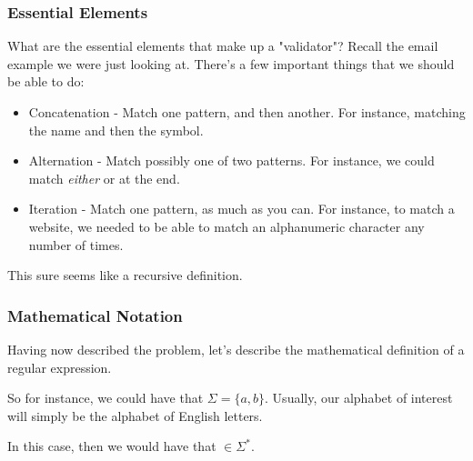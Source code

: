 \documentclass[aspectratio=169]{beamer}
\begin{document}
\begin{frame}[fragile]
  \frametitle{Essential Elements}

  \rprs

  What are the essential elements that make up a "validator"? Recall the email
  example we were just looking at. There's a few important things that we should
  be able to do:

  \pause
  \begin{itemize}
    \item Concatenation - Match one pattern, and then another. For instance,
    matching the name and then the  symbol. \pause
    \item Alternation - Match possibly one of two patterns. For instance, we
    could match \textit{either}  or  at the end. \pause
    \item Iteration - Match one pattern, as much as you can. For instance,
    to match a website, we needed to be able to match an alphanumeric character any
    number of times.
  \end{itemize}

  \pause
  \vspace{\fill}

  This sure seems like a recursive definition.
\end{frame}

\begin{frame}[fragile]
  \frametitle{Mathematical Notation}

  \ptmt

  Having now described the problem, let's describe the mathematical definition
  of a regular expression.

  \pause
  \vspace{\fill}


  \pause
  \vspace{\fill}

  So for instance, we could have that $\Sigma = \{a, b\}$. Usually, our
  alphabet of interest will simply be the alphabet of English letters.

  \pause
  \vspace{\fill}


  \pause
  \vspace{\fill}

  In this case, then we would have that  $\in \Sigma^*$.
\end{frame}
\end{document}

